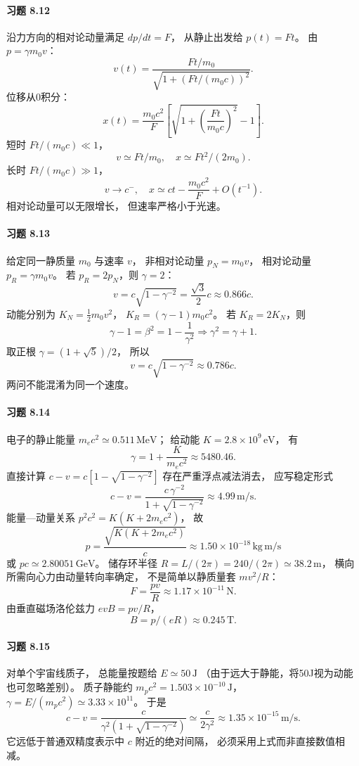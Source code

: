 \paragraph{习题 8.12}
沿力方向的相对论动量满足
\(dp/dt=F\)，
从静止出发给
\(p(t)=Ft\)。
由
\(p=\gamma m_0v\)：
\[
 \boxed{v(t)=
 \frac{Ft/m_0}{\sqrt{1+(Ft/(m_0c))^2}}}.
\]
位移从0积分：
\[
 \boxed{x(t)=\frac{m_0c^2}{F}
 \left[\sqrt{1+\left(\frac{Ft}{m_0c}\right)^2}-1\right]}.
\]
短时 \(Ft/(m_0c)\ll1\)，
\[
 \boxed{v\simeq Ft/m_0,\quad
 x\simeq Ft^2/(2m_0)}.
\]
长时 \(Ft/(m_0c)\gg1\)，
\[
 \boxed{v\to c^-,
 \quad x\simeq ct-\frac{m_0c^2}{F}
 +O(t^{-1})}.
\]
相对论动量可以无限增长，
但速率严格小于光速。


\paragraph{习题 8.13}
给定同一静质量 \(m_0\) 与速率 \(v\)，
非相对论动量 \(p_N=m_0v\)，
相对论动量 \(p_R=\gamma m_0v\)。
若 \(p_R=2p_N\)，则 \(\gamma=2\)：
\[
 \boxed{v=c\sqrt{1-\gamma^{-2}}
 =\frac{\sqrt3}{2}c\approx0.866c}.
\]
动能分别为
\(K_N=\tfrac12m_0v^2\)，
\(K_R=(\gamma-1)m_0c^2\)。
若 \(K_R=2K_N\)，则
\[
 \gamma-1=\beta^2
 =1-\frac1{\gamma^2}
 \Longrightarrow
 \gamma^2=\gamma+1.
\]
取正根
\(\gamma=(1+\sqrt5)/2\)，
所以
\[
 \boxed{v=c\sqrt{1-\gamma^{-2}}
 \approx0.786c}.
\]
两问不能混淆为同一个速度。

\paragraph{习题 8.14}
电子的静止能量
\(m_ec^2\simeq0.511\,\mathrm{MeV}\)；
给动能 \(K=2.8\times10^9\,\mathrm{eV}\)，
有
\[
 \gamma=1+\frac K{m_ec^2}\approx5480.46.
\]
直接计算
\(c-v=c[1-\sqrt{1-\gamma^{-2}}]\)
存在严重浮点减法消去，
应写稳定形式
\[
 \boxed{c-v=\frac{c\,\gamma^{-2}}
 {1+\sqrt{1-\gamma^{-2}}}
 \approx4.99\,\mathrm{m/s}}.
\]
能量—动量关系
\(p^2c^2=K(K+2m_ec^2)\)，
故
\[
 \boxed{p=\frac{\sqrt{K(K+2m_ec^2)}}c
 \approx1.50\times10^{-18}\,\mathrm{kg\,m/s}}
\]
或 \(pc\simeq2.80051\,\mathrm{GeV}\)。
储存环半径
\(R=L/(2\pi)=240/(2\pi)\simeq38.2\,\mathrm m\)，
横向所需向心力由动量转向率确定，
不是简单以静质量套 \(mv^2/R\)：
\[
 \boxed{F=\frac{pv}{R}\approx
 1.17\times10^{-11}\,\mathrm N}.
\]
由垂直磁场洛伦兹力
\(evB=pv/R\)，
\[
 \boxed{B=p/(eR)\approx0.245\,\mathrm T}.
\]

\paragraph{习题 8.15}
对单个宇宙线质子，
总能量按题给 \(E\simeq50\,\mathrm J\)
（由于远大于静能，将50J视为动能也可忽略差别）。
质子静能约
\(m_pc^2=1.503\times10^{-10}\,\mathrm J\)，
\(\gamma=E/(m_pc^2)\simeq3.33\times10^{11}\)。
于是
\[
 \boxed{c-v=
 \frac{c}{\gamma^2(1+\sqrt{1-\gamma^{-2}})}
 \simeq\frac{c}{2\gamma^2}
 \approx1.35\times10^{-15}\,\mathrm{m/s}}.
\]
它远低于普通双精度表示中
\(c\) 附近的绝对间隔，
必须采用上式而非直接数值相减。

